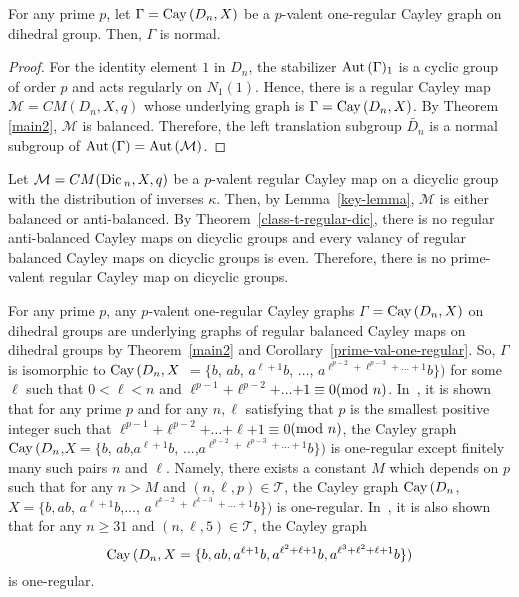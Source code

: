 \documentclass[12pt]{amsart}
\begin{document}
\begin{corollary} \label{prime-val-one-regular}
For any prime $p$, let $\Gamma = {\mbox{\rm Cay\,}}(D_n, X)$ be a $p$-valent
one-regular Cayley graph on dihedral group. Then, $\Gamma$ is
normal.
\end{corollary}
\begin{proof}
For the identity element $1$ in $D_n$, the stabilizer
${\mbox{\rm Aut\,}}(\Gamma)_{1}$ is a cyclic group of order $p$ and acts
regularly on $N_1(1)$. Hence, there is a regular  Cayley map
$\mathcal{ M} = CM(D_n, X, q)$ whose underlying graph is $\Gamma =
{\mbox{\rm Cay\,}}(D_n, X)$. By Theorem \ref{main2}, $\mathcal{ M}$ is balanced.
Therefore, the left translation subgroup $\tilde{D_n}$ is a normal
subgroup of ${\mbox{\rm Aut\,}}(\Gamma) = {\mbox{\rm Aut\,}}(\mathcal{ M})$.
\end{proof}

\begin{pfC}
Let $\mathcal{M} = CM({\mbox{\rm Dic\,}}_n, X, q)$ be a $p$-valent regular
Cayley map on a dicyclic group with the distribution of inverses
$\kappa$. Then, by Lemma~\ref{key-lemma}, $\mathcal{M}$ is either
balanced or anti-balanced.  By Theorem~\ref{class-t-regular-dic},
there is no regular anti-balanced Cayley maps on dicyclic groups
and every valancy of regular balanced Cayley maps on dicyclic
groups is even. Therefore, there is no prime-valent regular Cayley
map on dicyclic groups.
\end{pfC}

\begin{remark}
 For any prime $p$,
any $p$-valent one-regular Cayley graphs $\Gamma$ $= {\mbox{\rm Cay\,}}(D_n, X)$
on dihedral groups are underlying graphs of regular balanced
Cayley maps on dihedral groups by Theorem~\ref{main2} and
Corollary~\ref{prime-val-one-regular}. So, $\Gamma$ is isomorphic
to ${\mbox{\rm Cay\,}}(D_n,X$ $=\{b$, $ab$, $a^{\ell+1}b$, $\ldots$, $
a^{\ell^{p-2}+\ell^{p-3}+\ldots +1}b \})$ for some $\ell$ such
that $0 < \ell < n$ and $\ell^{p-1}$$+\ell^{p-2}$$+\ldots$$+1
\equiv 0 ({\hbox{\rm mod }} n)$. In~\cite{KKO}, it is shown that for
any prime $p$ and for any $n, \ell$ satisfying that $p$ is the
smallest positive integer such that $\ell^{p-1}$$+\ell^{p-2}$$ +
\ldots $$+ \ell $$+1 \equiv 0 $$({\hbox{\rm mod }} n)$, the Cayley graph
${\mbox{\rm Cay\,}}(D_n$,$X=\{b$, $ab$,$ a^{\ell+1}b$, $\ldots$,$
a^{\ell^{p-2}+\ell^{p-3}+ \ldots +1}b\})$ is one-regular except
finitely many such pairs $n$ and $\ell$. Namely, there exists a
constant $M$ which depends on $p$ such that for any $n > M$ and
$(n, \ell, p) \in \mathcal{T}$,  the Cayley graph
${\mbox{\rm Cay\,}}(D_n$,$X=\{b, ab$, $a^{\ell+1}b$,$\ldots$,
$a^{\ell^{k-2}+\ell^{k-3} +\ldots +1}b\})$ is one-regular.  In~\cite{KKO}, it is also shown that for any $n \geq 31$ and
$(n, \ell, 5) \in \mathcal{T}$, the Cayley graph
$${\mbox{\rm Cay\,}}(D_n,X=\{b, ab,
a^{\ell+1}b, a^{\ell^2 + \ell +1}b, a^{\ell^{3}+\ell^2+ \ell +
1}b\}) $$ is one-regular.
\end{remark}
\end{document}
